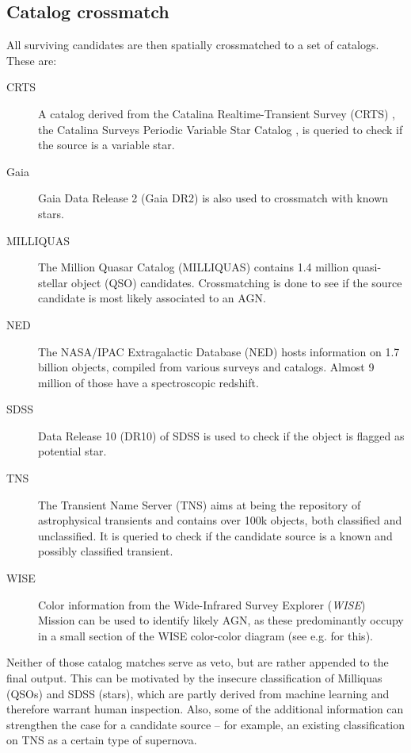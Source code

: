 \documentclass[
    a4paper, %
    fontsize=10pt, %
    twoside=true, %
    numbers=noenddot, %
    fontmethod=tex,
]{kaobook}
\begin{document}
\subsection{Catalog crossmatch}
All surviving candidates are then spatially crossmatched to a set of catalogs. These are:
\begin{description}
    \item[CRTS] A catalog derived from the Catalina Realtime-Transient Survey (CRTS) , the Catalina Surveys Periodic Variable Star Catalog , is queried to check if the source is a variable star.
    \item[Gaia] Gaia Data Release 2 (Gaia DR2)  is also used to crossmatch with known stars.
    \item[MILLIQUAS] The Million Quasar Catalog (MILLIQUAS)  contains 1.4 million quasi-stellar object (QSO) candidates. Crossmatching is done to see if the source candidate is most likely associated to an AGN.
    \item[NED] The NASA/IPAC Extragalactic Database (NED) hosts information on 1.7 billion objects, compiled from various surveys and catalogs. Almost 9 million of those have a spectroscopic redshift.
    \item[SDSS] Data Release 10 (DR10)  of SDSS is used to check if the object is flagged as potential star.
    \item[TNS] The Transient Name Server (TNS) aims at being the repository of astrophysical transients and contains over 100k objects, both classified and unclassified. It is queried to check if the candidate source is a known and possibly classified transient.
    \item[WISE] Color information from the Wide-Infrared Survey Explorer (\textit{WISE}) Mission  can be used to identify likely AGN, as these predominantly occupy in a small section of the WISE color-color diagram (see e.g.  for this).
\end{description}
Neither of those catalog matches serve as veto, but are rather appended to the final output. This can be motivated by the insecure classification of Milliquas (QSOs) and SDSS (stars), which are partly derived from machine learning and therefore warrant human inspection. Also, some of the additional information can strengthen the case for a candidate source -- for example, an existing classification on TNS as a certain type of supernova. 
\end{document}
